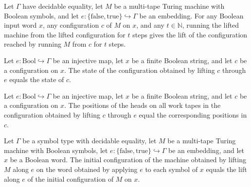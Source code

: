 \begin{theorem}
\label{Turing.MultiTapeTM.liftSymbols_runFrom}
\leanok
{}
Let $\Gamma$ have decidable equality, let $M$ be a multi-tape Turing machine with
Boolean symbols, and let $e:\{\mathrm{false},\mathrm{true}\}\hookrightarrow\Gamma$ be an
embedding. For any Boolean input word $x$, any configuration $c$ of $M$ on $x$, and any
$t\in\mathbb{N}$, running the lifted machine from the lifted configuration for $t$ steps
gives the lift of the configuration reached by running $M$ from $c$ for $t$ steps.
\end{theorem}

\begin{lemma}
\label{Turing.Cfg.liftSymbols_state}
\leanok
{}
Let $e:\mathrm{Bool}\hookrightarrow\Gamma$ be an injective map, let $x$ be a finite Boolean string, and let
$c$ be a configuration on $x$. The state of the configuration obtained by lifting $c$
through $e$ equals the state of $c$.
\end{lemma}

\begin{lemma}
\label{Turing.Cfg.liftSymbols_workTapePos}
\leanok
{}
Let $e:\mathrm{Bool}\hookrightarrow\Gamma$ be an injective map, let $x$ be a finite Boolean string, and let
$c$ be a configuration on $x$. The positions of the heads on all work tapes in the
configuration obtained by lifting $c$ through $e$ equal the corresponding positions in
$c$.
\end{lemma}

\begin{lemma}
\label{Turing.MultiTapeTM.liftSymbols_initCfg}
\leanok
{}
Let $\Gamma$ be a symbol type with decidable equality, let $M$ be a multi-tape Turing
machine with Boolean symbols, let
$e:\{\mathrm{false},\mathrm{true}\}\hookrightarrow\Gamma$ be an embedding, and let $x$
be a Boolean word. The initial configuration of the machine obtained by lifting $M$
along $e$ on the word obtained by applying $e$ to each symbol of $x$ equals the lift
along $e$ of the initial configuration of $M$ on $x$.
\end{lemma}

